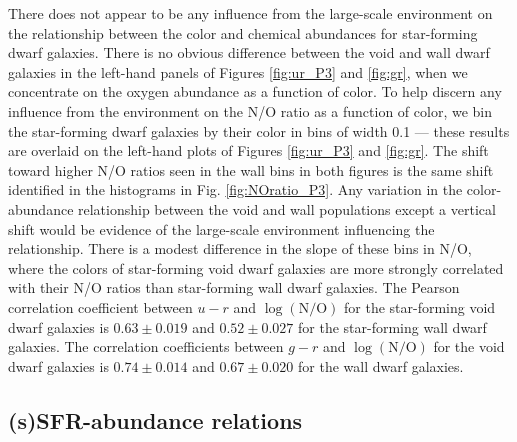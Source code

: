 There does not appear to be any influence from the large-scale environment on 
the relationship between the color and chemical abundances for star-forming 
dwarf galaxies.  There is no obvious difference between the void and wall dwarf 
galaxies in the left-hand panels of Figures \ref{fig:ur_P3} and \ref{fig:gr}, 
when we concentrate on the oxygen abundance as a function of color.  To help 
discern any influence from the environment on the N/O ratio as a function of 
color, we bin the star-forming dwarf galaxies by their color in bins of width 
0.1 --- these results are overlaid on the left-hand plots of Figures 
\ref{fig:ur_P3} and \ref{fig:gr}.  The shift toward higher N/O ratios seen in 
the wall bins in both figures is the same shift identified in the histograms in 
Fig. \ref{fig:NOratio_P3}.  Any variation in the color-abundance relationship 
between the void and wall populations except a vertical shift would be evidence 
of the large-scale environment influencing the relationship.  There is a modest 
difference in the slope of these bins in N/O, where the colors of star-forming 
void dwarf galaxies are more strongly correlated with their N/O ratios than 
star-forming wall dwarf galaxies.  The Pearson correlation coefficient between 
$u-r$ and $\log (\text{N}/\text{O})$ for the star-forming void dwarf galaxies is 
$0.63\pm 0.019$ and $0.52\pm 0.027$ for the star-forming wall dwarf galaxies.  
The correlation coefficients between $g-r$ and $\log (\text{N}/\text{O})$ for 
the void dwarf galaxies is $0.74\pm 0.014$ and $0.67\pm 0.020$ for the wall 
dwarf galaxies.  


\subsection{(s)SFR-abundance relations}

